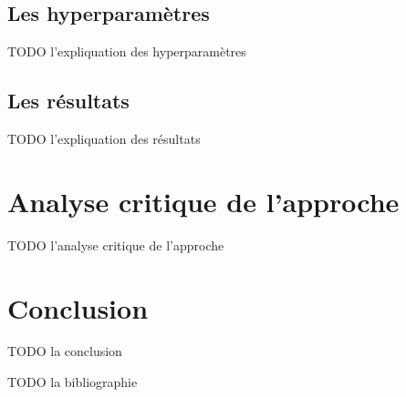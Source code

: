 \documentclass{article}
\begin{document}
\subsection{Les hyperparamètres}

TODO l'expliquation des hyperparamètres

\subsection{Les résultats}

TODO l'expliquation des résultats

\section{Analyse critique de l'approche}

TODO l'analyse critique de l'approche

\section{Conclusion}

TODO la conclusion





TODO la bibliographie
\end{document}
